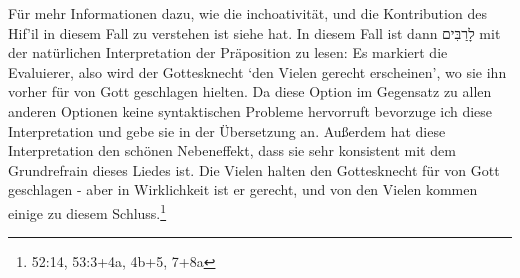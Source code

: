\begin{description}
{		Für mehr Informationen dazu, wie die inchoativität, und die Kontribution des Hif'il in diesem Fall zu verstehen ist siehe \Cite[211f]{hebrew-verbs-of-judgement}} hat.
		In diesem Fall ist dann לָרַבִּים mit der natürlichen Interpretation der Präposition zu lesen: Es markiert die Evaluierer, also wird der Gottesknecht `den Vielen gerecht erscheinen',
		wo sie ihn vorher für von Gott geschlagen hielten.
		Da diese Option im Gegensatz zu allen anderen Optionen keine syntaktischen Probleme hervorruft bevorzuge ich diese Interpretation und gebe sie in der Übersetzung an.
		Außerdem hat diese Interpretation den schönen Nebeneffekt, dass sie sehr konsistent mit dem Grundrefrain dieses Liedes ist.
		Die Vielen halten den Gottesknecht für von Gott geschlagen - aber in Wirklichkeit ist er gerecht, und von den Vielen kommen einige zu diesem Schluss.\footnote{52:14, 53:3+4a, 4b+5, 7+8a}


\end{description}
